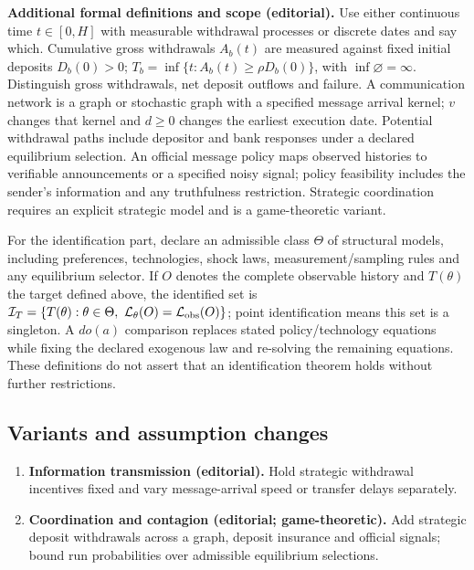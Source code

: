 \documentclass[11pt,a4paper]{article}
\begin{document}
\textbf{Additional formal definitions and scope (editorial).} Use either continuous time \(t\in[0,H]\) with measurable withdrawal processes or discrete dates and say which. Cumulative gross withdrawals \(A_b(t)\) are measured against fixed initial deposits \(D_b(0)>0\); \(T_b=\inf\{t:A_b(t)\geq\rho D_b(0)\}\), with \(\inf\varnothing=\infty\). Distinguish gross withdrawals, net deposit outflows and failure. A communication network is a graph or stochastic graph with a specified message arrival kernel; \(v\) changes that kernel and \(d\geq0\) changes the earliest execution date. Potential withdrawal paths include depositor and bank responses under a declared equilibrium selection. An official message policy maps observed histories to verifiable announcements or a specified noisy signal; policy feasibility includes the sender's information and any truthfulness restriction. Strategic coordination requires an explicit strategic model and is a game-theoretic variant.

For the identification part, declare an admissible class \(\Theta\) of structural models, including preferences, technologies, shock laws, measurement/sampling rules and any equilibrium selector. If \(O\) denotes the complete observable history and \(T(\theta)\) the target defined above, the identified set is \(\mathcal I_T=\{T(\theta):\theta\in\Theta,\ \mathcal L_\theta(O)=\mathcal L_{\rm obs}(O)\}\); point identification means this set is a singleton. A \(do(a)\) comparison replaces stated policy/technology equations while fixing the declared exogenous law and re-solving the remaining equations. These definitions do not assert that an identification theorem holds without further restrictions.
\subsection*{Variants and assumption changes}
\begin{enumerate}
\item \textbf{Information transmission (editorial).} Hold strategic withdrawal incentives fixed and vary message-arrival speed or transfer delays separately.
\item \textbf{Coordination and contagion (editorial; game-theoretic).} Add strategic deposit withdrawals across a graph, deposit insurance and official signals; bound run probabilities over admissible equilibrium selections.
\end{enumerate}
\end{document}
